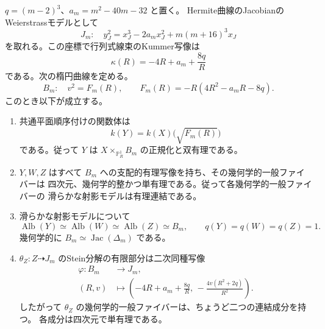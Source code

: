 \begin{theorem}
\label{thm:kummer-albanese-v30}
$q=(m-2)^3$、$a_m=m^2-40m-32$ と置く。
Hermite曲線のJacobianのWeierstrassモデルとして
\begin{equation}\label{eq:Jm-v30}
 J_m:\quad y_J^2=x_J^3-2a_mx_J^2+m(m+16)^3x_J
\end{equation}
を取れる。この座標で行列式線束のKummer写像は
\begin{equation}\label{eq:kappa-R-v30}
 \boxed{\quad\kappa(R)=-4R+a_m+\frac{8q}{R}\quad}
\end{equation}
である。次の楕円曲線を定める。
\begin{equation}\label{eq:Bm-v30}
 B_m:\quad v^2=F_m(R),\qquad
 F_m(R)=-R(4R^2-a_mR-8q).
\end{equation}
このとき以下が成立する。
\begin{enumerate}
\item 共通平面順序付けの関数体は
\[
 k(Y)=k(X)\bigl(\sqrt{F_m(R)}\bigr)
\]
である。従って $Y$ は $X\times_{\mathbb P^1_R}B_m$ の正規化と双有理である。
\item $Y,W,Z$ はすべて $B_m$ への支配的有理写像を持ち、その幾何学的一般ファイバーは
四次元、幾何学的整かつ単有理である。従って各幾何学的一般ファイバーの
滑らかな射影モデルは有理連結である。
\item 滑らかな射影モデルについて
\begin{equation}\label{eq:Alb-v30}
 \operatorname{Alb}(Y)\simeq\operatorname{Alb}(W)
 \simeq\operatorname{Alb}(Z)\simeq B_m,
 \qquad q(Y)=q(W)=q(Z)=1.
\end{equation}
幾何学的に $B_m\simeq\operatorname{Jac}(\Delta_m)$ である。
\item $\theta_Z:Z\dashrightarrow J_m$ のStein分解の有限部分は二次同種写像
\begin{equation}\label{eq:phi-m-v30}
 \begin{split}
 \varphi:B_m&\longrightarrow J_m,\\
 (R,v)&\longmapsto\left(
 -4R+a_m+\frac{8q}{R},\,
 -\frac{4v(R^2+2q)}{R^2}\right).
 \end{split}
\end{equation}
したがって $\theta_Z$ の幾何学的一般ファイバーは、ちょうど二つの連結成分を持つ。
各成分は四次元で単有理である。
\end{enumerate}
\end{theorem}

